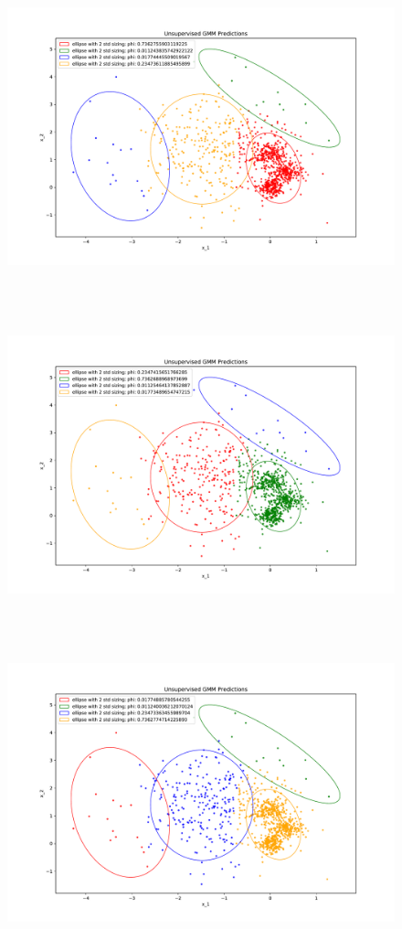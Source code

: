 %
%
\begin{answer}
	\begin{figure}[H]
		\includegraphics[width=15cm,height=9cm,keepaspectratio]{../src/semi_supervised_em/pred_0.pdf}
	\end{figure}
	\begin{figure}[H]
		\includegraphics[width=15cm,height=9cm,keepaspectratio]{../src/semi_supervised_em/pred_1.pdf}
	\end{figure}
		\begin{figure}[H]
		\includegraphics[width=15cm,height=9cm,keepaspectratio]{../src/semi_supervised_em/pred_2.pdf}

\end{figure}
\end{answer}
